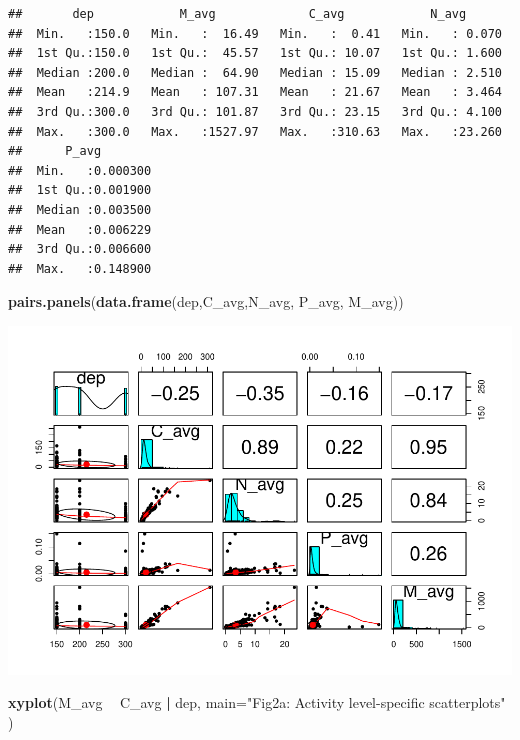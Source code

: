\documentclass[]{article}
\newenvironment{Shaded}{\begin{snugshade}}{\end{snugshade}}
\newcommand{\DataTypeTok}[1]{\textcolor[rgb]{0.13,0.29,0.53}{#1}}
\newcommand{\KeywordTok}[1]{\textcolor[rgb]{0.13,0.29,0.53}{\textbf{#1}}}
\newcommand{\NormalTok}[1]{#1}
\newcommand{\OperatorTok}[1]{\textcolor[rgb]{0.81,0.36,0.00}{\textbf{#1}}}
\newcommand{\StringTok}[1]{\textcolor[rgb]{0.31,0.60,0.02}{#1}}
\begin{document}
\begin{verbatim}
##       dep            M_avg             C_avg            N_avg       
##  Min.   :150.0   Min.   :  16.49   Min.   :  0.41   Min.   : 0.070  
##  1st Qu.:150.0   1st Qu.:  45.57   1st Qu.: 10.07   1st Qu.: 1.600  
##  Median :200.0   Median :  64.90   Median : 15.09   Median : 2.510  
##  Mean   :214.9   Mean   : 107.31   Mean   : 21.67   Mean   : 3.464  
##  3rd Qu.:300.0   3rd Qu.: 101.87   3rd Qu.: 23.15   3rd Qu.: 4.100  
##  Max.   :300.0   Max.   :1527.97   Max.   :310.63   Max.   :23.260  
##      P_avg         
##  Min.   :0.000300  
##  1st Qu.:0.001900  
##  Median :0.003500  
##  Mean   :0.006229  
##  3rd Qu.:0.006600  
##  Max.   :0.148900
\end{verbatim}

\begin{Shaded}
\begin{Highlighting}[]
\KeywordTok{pairs.panels}\NormalTok{(}\KeywordTok{data.frame}\NormalTok{(dep,C_avg,N_avg, P_avg, M_avg))}
\end{Highlighting}
\end{Shaded}

\includegraphics{Term_Project_files/figure-latex/unnamed-chunk-2-1.pdf}

\begin{Shaded}
\begin{Highlighting}[]
\KeywordTok{xyplot}\NormalTok{(M_avg }\OperatorTok{~}\StringTok{ }\NormalTok{C_avg }\OperatorTok{|}\StringTok{ }\NormalTok{dep, }
                  \DataTypeTok{main=}\StringTok{"Fig2a: Activity level-specific scatterplots"}
\NormalTok{           )}
\end{Highlighting}
\end{Shaded}
\end{document}
